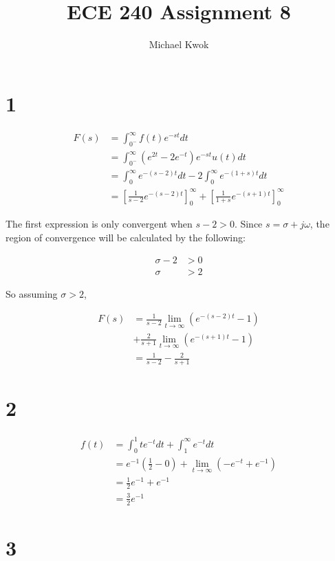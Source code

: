 \documentclass{article}
\title{ECE 240 Assignment 8}
\author{Michael Kwok}
\begin{document}
\maketitle
\begin{multicols}{2}
\section*{1}
\begin{align*}
F(s) &= \int_{0^-}^\infty f(t)e^{-st}dt\\
&= \int_{0^-}^\infty \left(e^{2t} -2e^{-t}\right)e^{-st} u(t)dt\\
&= \int_{0}^\infty e^{-(s-2)t}dt - 2\int_{0}^\infty e^{-(1+s)t}dt\\
&= \left[\frac{1}{s-2}e^{-(s-2)t}\right]^\infty_0 + \left[ \frac{1}{1+s}e^{-(s+1)t}\right]^\infty_0
\end{align*}

The first expression is only convergent when $s-2 > 0$. Since $s = \sigma + j\omega$, the region of convergence will be calculated by the following:
 
\begin{align*}
    \sigma -2 &> 0\\
    \sigma &> 2
\end{align*}

So assuming $\sigma > 2$,

\begin{align*}
    F(s) &= \frac{1}{s-2} \lim_{t \to \infty} \left( e^{-(s-2)t} -1 \right)\\
    &+ \frac{2}{s+1} \lim_{t \to \infty} \left( e^{-(s+1)t} -1 \right)\\
    &= \boxed{\frac{1}{s-2} - \frac{2}{s+1}}
\end{align*}
\section*{2}
\begin{align*}
    f(t) &= \int_0^1 te^{-t}dt + \int_1^\infty e^{-t}dt\\
    &= e^{-1}\left(\frac{1}{2} - 0\right) + \lim_{t\to\infty}\left(-e^{-t} + e^{-1}\right)\\
    &= \frac{1}{2} e^{-1} + e^{-1}\\
    &= \boxed{\frac{3}{2}e^{-1}}
\end{align*}
\section*{3}

\end{multicols}
\end{document}
